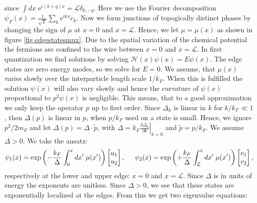 since $\int dx\; \text{e}^{i(k + q)x} =\mathcal{L} \delta_{k,-q} $. Here we use the Fourier decomposition $\psi_{F}(x) = \frac{1}{\sqrt{L}}\sum_k\text{e}^{ikx}c_k$. Now we form junctions of topogically distinct phases by changing the sign of $\mu$ at $x = 0$ and $x = \mathcal{L}$. Hence, we let $\mu = \mu(x)$ as shown in figure \ref{fig.edgestatesmux}. Due to the spatial variation of the chemical potential the fermions are confined to the wire between $x = 0$ and $x = \mathcal{L}$. In first quantization we find solutions by solving $\mathcal{H}(x)\psi(x) = E\psi(x)$. The edge states are zero energy modes, so we solve for $ E = 0$. We assume, that $\mu(x)$ varies slowly over the interparticle length scale $1/k_F$. When this is fulfilled the solution $\psi(x)$ will also vary slowly and hence the curvature of $\psi(x)$ proportional to $p^2\psi(x)$ is negligible. This means, that to a good approximation we only keep the operator $p$ up to first order. Since $\Delta_k$ is linear in $k$ for $k/k_F \ll 1$, then $\Delta(p)$ is linear in $p$, when $p/k_F$ used on a state is small. Hence, we ignore $p^2/2m_F$ and let $\Delta(p) = \Delta \cdot \tilde{p}$, with $\Delta = k_F\left.\frac{\partial \Delta_k}{\partial k}\right|_{k=0}$ and $\tilde{p} = p/k_F$. We assume $\Delta > 0$. We take the ansatz:
\begin{equation}
\psi_1(x) = \exp\left(-\frac{k_F}{\Delta}\int_{0}^{x} dx'\; \mu(x') \right)\begin{bmatrix} u_1 \\ u_2 \end{bmatrix}, \hspace{0.5cm} \psi_2(x) = \exp\left(+\frac{k_F}{\Delta}\int_{\mathcal{L}}^{x} dx'\; \mu(x') \right)\begin{bmatrix} v_1 \\ v_2 \end{bmatrix}, \nonumber
\end{equation}  
respectively at the lower and upper edge: $x = 0$ and $x = \mathcal{L}$. Since $\Delta$ is in units of energy the exponents are unitless. Since $\Delta > 0$, we see that these states are exponentially localized at the edges. From this we get two eigenvalue equations:
